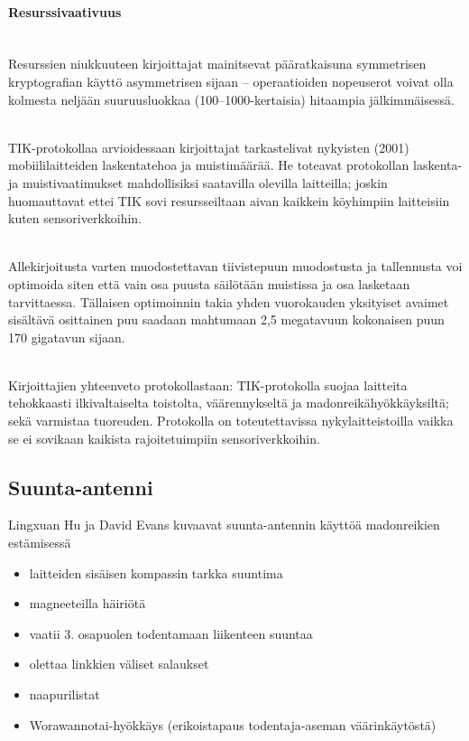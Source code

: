 \documentclass[finnish]{tktltiki2}
\theoremstyle{definition}
\theoremstyle{remark}
\begin{document}
\paragraph{Resurssivaativuus} 
\noindent \\
Resurssien niukkuuteen kirjoittajat mainitsevat pääratkaisuna symmetrisen kryptografian käyttö asymmetrisen sijaan – operaatioiden nopeuserot voivat olla kolmesta neljään suuruusluokkaa (100–1000-kertaisia) hitaampia jälkimmäisessä.

\noindent \\
TIK-protokollaa arvioidessaan kirjoittajat tarkastelivat nykyisten (2001) mobiililaitteiden laskentatehoa ja muistimäärää. He toteavat protokollan laskenta- ja muistivaatimukset mahdollisiksi saatavilla olevilla laitteilla; joskin huomauttavat ettei TIK sovi resursseiltaan aivan kaikkein köyhimpiin laitteisiin kuten sensoriverkkoihin.

\noindent \\
Allekirjoitusta varten muodostettavan tiivistepuun muodostusta ja tallennusta voi optimoida siten että vain osa puusta säilötään muistissa ja osa lasketaan tarvittaessa. Tällaisen optimoinnin takia yhden vuorokauden yksityiset avaimet sisältävä osittainen puu saadaan mahtumaan 2,5 megatavuun kokonaisen puun 170 gigatavun sijaan.

\noindent \\
Kirjoittajien yhteenveto protokollastaan: TIK-protokolla suojaa laitteita tehokkaasti ilkivaltaiselta toistolta, väärennykseltä ja madonreikähyökkäyksiltä; sekä varmistaa tuoreuden. Protokolla on toteutettavissa nykylaitteistoilla vaikka se ei sovikaan kaikista rajoitetuimpiin sensoriverkkoihin.

\subsection{Suunta-antenni}
Lingxuan Hu ja David Evans kuvaavat suunta-antennin käyttöä madonreikien estämisessä \cite{antenna}
\begin{itemize}
\item laitteiden sisäisen kompassin tarkka suuntima
\item magneeteilla häiriötä
\item vaatii 3. osapuolen todentamaan liikenteen suuntaa
\item olettaa linkkien väliset salaukset
\item naapurilistat
\item Worawannotai-hyökkäys (erikoistapaus todentaja-aseman väärinkäytöstä)
\end{itemize}
\end{document}
